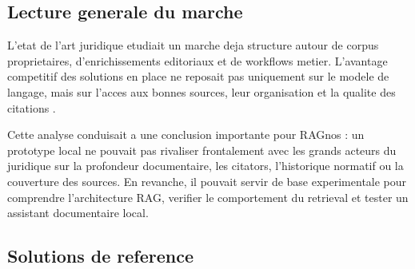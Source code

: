 \documentclass[11pt,a4paper]{article}
\begin{document}
\subsection{Lecture generale du marche}

L'etat de l'art juridique etudiait un marche deja structure autour de corpus proprietaires, d'enrichissements editoriaux et de workflows metier. L'avantage competitif des solutions en place ne reposait pas uniquement sur le modele de langage, mais sur l'acces aux bonnes sources, leur organisation et la qualite des citations \autocite{researchLegalAIExhaustif,researchLegalRAGState}.

Cette analyse conduisait a une conclusion importante pour RAGnos : un prototype local ne pouvait pas rivaliser frontalement avec les grands acteurs du juridique sur la profondeur documentaire, les citators, l'historique normatif ou la couverture des sources. En revanche, il pouvait servir de base experimentale pour comprendre l'architecture RAG, verifier le comportement du retrieval et tester un assistant documentaire local.

\subsection{Solutions de reference}
\end{document}
